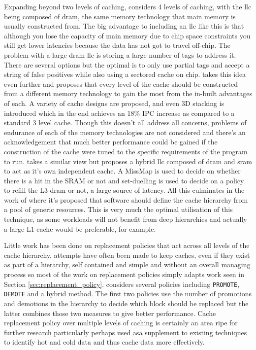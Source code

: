 Expanding beyond two levels of caching, \citet{zhaoExploringDRAMCache2007} considers 4 levels of caching, with the \gls{llc} being composed of \gls{dram}, the same memory technology that main memory is usually constructed from. The big advantage to including an \gls{llc} like this is that although you lose the capacity of main memory due to chip space constraints you still get lower latencies because the data has not got to travel off-chip. The problem with a large \gls{dram} \gls{llc} is storing a large number of tags to address it. There are several options but the optimal is to only use partial tags and accept a string of false positives while also using a sectored cache on chip. \citet{wuHybridCacheArchitecture2009} takes this idea even further and proposes that every level of the cache should be constructed from a different memory technology to gain the most from the in-built advantages of each. A variety of cache designs are proposed, and even 3D stacking is introduced which in the end achieves an 18\% IPC increase as compared to a standard 3 level cache. Though this doesn't all address all concerns, problems of endurance of each of the memory technologies are not considered and there's an acknowledgement that much better performance could be gained if the construction of the cache were tuned to the specific requirements of the program to run. \citet{hameedAdaptiveCacheManagement2013, hameedReducingLatencySRAM2014} takes a similar view but proposes a hybrid \gls{llc} composed of \gls{dram} and \gls{sram} to act as it's own independent cache. A MissMap \cite{lohEfficientlyEnablingConventional2011} is used to decide on whether there is a hit in the SRAM or not and set-duelling is used to decide on a policy to refill the L3-\gls{dram} or not, a large source of latency. All this culminates in the work of \citet{tsaiJengaSoftwaredefinedCache2017} where it's proposed that software should define the cache hierarchy from a pool of generic resources. This is very much the optimal utilisation of this technique, as some workloads will not benefit from deep hierarchies and actually a large L1 cache would be preferable, for example. 

Little work has been done on replacement policies that act across all levels of the cache hierarchy, attempts have often been made to keep caches, even if they exist as part of a hierarchy, self contained and simple and without an overall managing process so most of the work on replacement policies simply adapts work seen in Section \ref{sec:replacement_policy}. \citet{kelwadeReputationBasedCache2017} considers several policies including \texttt{PROMOTE}, \texttt{DEMOTE} and a hybrid method. The first two policies use the number of promotions and demotions in the hierarchy to decide which block should be replaced but the latter combines those two measures to give better performance. Cache replacement policy over multiple levels of caching is certainly an area ripe for further research particularly perhaps used asa supplement to existing techniques to identify hot and cold data and thus cache data more effectively.

